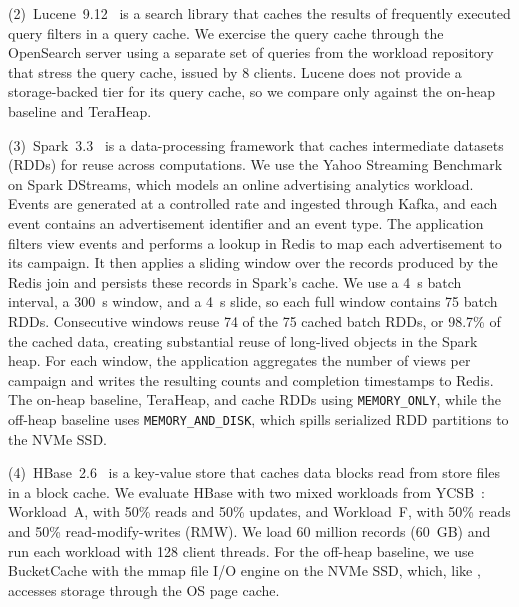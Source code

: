 (2)~Lucene~9.12~\cite{mccandless:lucene} is a search library that caches the results of frequently executed query filters in a query cache.
We exercise the query cache through the OpenSearch server using a separate set of queries from the workload repository~\cite{opensearch:query_cache_benchmarks} that stress the query cache, issued by 8 clients.
Lucene does not provide a storage-backed tier for its query cache, so we compare \chipperName{} only against the on-heap baseline and TeraHeap.

(3)~Spark~3.3~\cite{zaharia:spark} is a data-processing framework that caches intermediate datasets (RDDs) for reuse across computations.
We use the Yahoo Streaming Benchmark~\cite{chintapalli:yahoo} on Spark DStreams, which models an online advertising analytics workload.
Events are generated at a controlled rate and ingested through Kafka, and each event contains an advertisement identifier and an event type.
The application filters view events and performs a lookup in Redis to map each advertisement to its campaign.
It then applies a sliding window over the records produced by the Redis join and persists these records in Spark's cache.
We use a \SI{4}{s} batch interval, a \SI{300}{s} window, and a \SI{4}{s} slide, so each full window contains 75 batch RDDs.
Consecutive windows reuse 74 of the 75 cached batch RDDs, or 98.7\% of the cached data, creating substantial reuse of long-lived objects in the Spark heap.
For each window, the application aggregates the number of views per campaign and writes the resulting counts and completion timestamps to Redis.
The on-heap baseline, TeraHeap, and \chipperName{} cache RDDs using \texttt{MEMORY\_ONLY}, while the off-heap baseline uses \texttt{MEMORY\_AND\_DISK}, which spills serialized RDD partitions to the NVMe SSD.

(4)~HBase~2.6~\cite{vohra:hbase} is a key-value store that caches data blocks read from store files in a block cache.
We evaluate HBase with two mixed workloads from YCSB~\cite{cooper:ycsb}: Workload~A, with 50\% reads and 50\% updates, and Workload~F, with 50\% reads and 50\% read-modify-writes (RMW).
We load 60 million records (\SI{60}{GB}) and run each workload with 128 client threads.
For the off-heap baseline, we use BucketCache with the mmap file I/O engine on the NVMe SSD, which, like \chipperName{}, accesses storage through the OS page cache.

